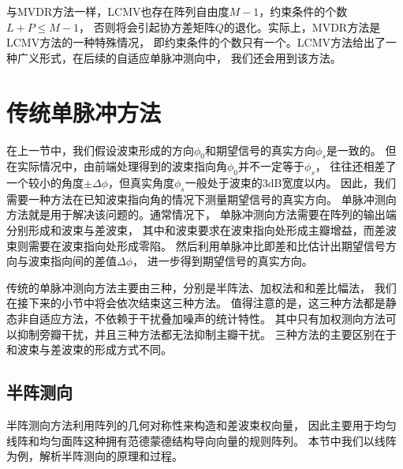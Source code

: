 \documentclass[master]{thesis-uestc}
\begin{document}
与MVDR方法一样，LCMV也存在阵列自由度$M-1$，约束条件的个数$L+P \leq M-1$，
否则将会引起协方差矩阵$Q$的退化。实际上，MVDR方法是LCMV方法的一种特殊情况，
即约束条件的个数只有一个。LCMV方法给出了一种广义形式，在后续的自适应单脉冲测向中，
我们还会用到该方法。

\section{传统单脉冲方法}
在上一节中，我们假设波束形成的方向$\phi_0$和期望信号的真实方向$\phi_s$是一致的。
但在实际情况中，由前端处理得到的波束指向角$\phi_0$并不一定等于$\phi_s$，
往往还相差了一个较小的角度$\pm\Delta\phi$，但真实角度$\phi_s$一般处于波束的$3$dB宽度以内。
因此，我们需要一种方法在已知波束指向角的情况下测量期望信号的真实方向。
单脉冲测向方法就是用于解决该问题的。通常情况下，
单脉冲测向方法需要在阵列的输出端分别形成和波束与差波束，
其中和波束要求在波束指向处形成主瓣增益，而差波束则需要在波束指向处形成零陷。
然后利用单脉冲比即差和比估计出期望信号方向与波束指向间的差值$\Delta\phi$，
进一步得到期望信号的真实方向。

传统的单脉冲测向方法主要由三种，分别是半阵法、加权法和和差比幅法，
我们在接下来的小节中将会依次结束这三种方法。
值得注意的是，这三种方法都是静态非自适应方法，不依赖于干扰叠加噪声的统计特性。
其中只有加权测向方法可以抑制旁瓣干扰，并且三种方法都无法抑制主瓣干扰。
三种方法的主要区别在于和波束与差波束的形成方式不同。

\subsection{半阵测向}
半阵测向方法利用阵列的几何对称性来构造和差波束权向量，
因此主要用于均匀线阵和均匀面阵这种拥有范德蒙德结构导向向量的规则阵列。
本节中我们以线阵为例，解析半阵测向的原理和过程。
\end{document}
